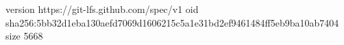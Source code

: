 version https://git-lfs.github.com/spec/v1
oid sha256:5bb32d1eba130aefd7069d1606215c5a1e31bd2ef9461484ff5eb9ba10ab7404
size 5668
